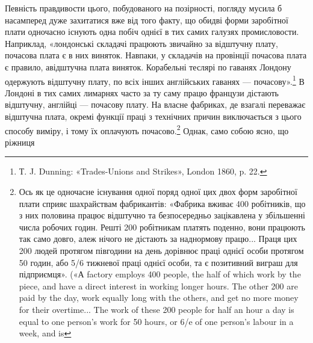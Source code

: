 Певність правдивости цього, побудованого на позірності, погляду
мусила б насамперед дуже захитатися вже від того факту,
що обидві форми заробітної плати одночасно існують одна побіч
однієї в тих самих галузях промисловости. Наприклад, «лондонські
складачі працюють звичайно за відштучну плату, почасова
плата є в них виняток. Навпаки, у складачів на провінції
почасова плата є правило, авідштучна плата виняток. Корабельні
теслярі по гаванях Лондону одержують відштучну плату, по
всіх інших англійських гаванях — почасову».\footnote{
Т. J. Dunning: «Trades-Unions and Strikes», London 1860,
p. 22.
} В Лондоні в
тих самих лимарнях часто за ту саму працю французи дістають
відштучну, англійці — почасову плату. На власне фабриках,
де взагалі переважає відштучна плата, окремі функції праці з
технічних причин виключається з цього способу виміру, і тому
їх оплачують почасово.\footnote{
Ось як це одночасне існування одної поряд одної цих двох форм
заробітної плати сприяє шахрайствам фабрикантів: «Фабрика вживає
400 робітників, що з них половина працює відштучно та безпосередньо
зацікавлена у збільшенні числа робочих годин. Решті 200 робітникам
платять поденно, вони працюють так само довго, алеж нічого не дістають
за наднормову працю... Праця цих 200 людей протягом півгодини
на день дорівнює праці однієї особи протягом 50 годин, або 5/6 тижневої
праці однієї особи, та є позитивний виграш для підприємця». («А factory
employs 400 people, the half of which work by the piece, and have a direct
interest in working longer hours. The other 200 are paid by the day,
work equally long with the others, and get no more money for their overtime...
The work of these 200 people for half an hour a day is equal to one
person’s work for 50 hours, or 6/e of one person’s labour in a week, and is
} Однак, само собою ясно, що ріжниця